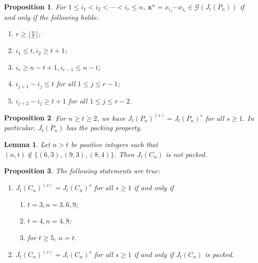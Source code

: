 \documentclass[10pt,a4paper]{amsart}
\newtheorem{lemma}{Lemma}
\newtheorem{proposition}{Proposition}
\begin{document}
\begin{proposition}\label{prop: mingens of J_t(P_n)}
    For $1\leq i_1<i_2<\cdots < i_r\leq n$, $\mathbf{x}^{\alpha}=x_{i_1}\cdots x_{i_r}\in \mathcal{G}(J_t(P_n))$ if and only if the following holds:
    \begin{enumerate}
        \item $r\geq \lfloor \frac{n}{t} \rfloor$;
        \item $i_1\leq t, i_2\geq t+1$;
        \item $i_r\geq n-t+1, i_{r-1}\leq n-t$;
        \item $i_{j+1}-i_{j}\leq t$ for all $1\leq j \leq r-1$;
        \item $i_{j+2}-i_{j}\geq t+1$ for all $1\leq j\leq r-2$.
    \end{enumerate}
\end{proposition}

\begin{proposition}\label{prop: Symbolic Prop for P_n}
    For $n\geq t\geq 2$, we have $J_t(P_n)^{(s)}= J_t(P_n)^{s}$ for all $s\geq 1$. In particular, $J_t(P_n)$ has the packing property. 
\end{proposition}

\begin{lemma}\label{lem:cycle-not-packed}
    Let $n>t$ be positive integers such that $(n,t) \notin \{(6,3),(9,3), (8,4)\}$. Then $J_t(C_n)$ is not packed.    
\end{lemma}

\begin{proposition}\label{prop:symbolicpowers-cycles}
    The following statements are true:
    \begin{enumerate}
        \item $J_t(C_n)^{(s)}= J_t(C_n)^{s}$ for all $s\geq 1$ if and only if 
\begin{enumerate}
            \item $t=3, n=3,6,9$;
            
            \item $t=4, n=4,8$;
            
            \item for $t\geq 5$, $n=t$.
        \end{enumerate}
        
        \item $J_t(C_n)^{(s)}= J_t(C_n)^{s}$ for all $s\geq 1$ if and only if $J_t(C_n)$ is packed.
    \end{enumerate}    
\end{proposition}
\end{document}
